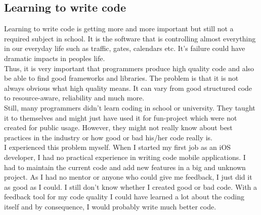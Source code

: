 \subsection{Learning to write code}
Learning to write code is getting more and more important but still not a required subject in school. It is the software that is controlling almost everything in our everyday life such as traffic, gates, calendars etc. It's failure could have dramatic impacts in peoples life.\\
Thus, it is very important that programmers produce high quality code and also be able to find good frameworks and libraries. The problem is that it is not always obvious what high quality means. It can vary from good structured code to resource-aware, reliability and much more.
\\Still, many programmers didn't learn coding in school or university. They taught it to themselves and might just have used it for fun-project which were not created for public usage. However, they might not really know about best practices in the industry or how good or bad his/her code really is.\\
I experienced this problem myself.
When I started my first job as an iOS developer, I had no practical experience in writing code mobile applications. I had to maintain the current code and add new features in a big and unknown project. As I had no mentor or anyone who could give me feedback, I just did it as good as I could. I still don't know whether I created good or bad code. With a feedback tool for my code quality I could have learned a lot about the coding itself and by consequence, I would probably write much better code.


